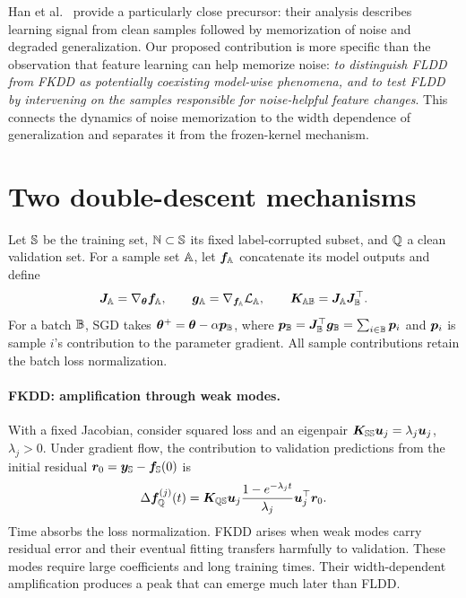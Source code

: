 \documentclass[10pt]{article}
\begin{document}
Han et al.~\cite{pmlr-v267-han25c} provide a particularly close precursor: their analysis describes learning signal from clean samples followed by memorization of noise and degraded generalization. Our proposed contribution is more specific than the observation that feature learning can help memorize noise: \emph{to distinguish FLDD from FKDD as potentially coexisting model-wise phenomena, and to test FLDD by intervening on the samples responsible for noise-helpful feature changes}. This connects the dynamics of noise memorization to the width dependence of generalization and separates it from the frozen-kernel mechanism.

\section{Two double-descent mechanisms}
Let ${\mathbb{S}}$ be the training set, ${\mathbb{N}}\subset{\mathbb{S}}$ its fixed label-corrupted subset, and ${\mathbb{Q}}$ a clean validation set. For a sample set ${\mathbb{A}}$, let ${\bm{f}}_{{\mathbb{A}}}$ concatenate its model outputs and define
\begin{equation}
 {\bm{J}}_{{\mathbb{A}}}=\nabla_{{\bm{\theta}}}{\bm{f}}_{{\mathbb{A}}},\qquad
 {\bm{g}}_{{\mathbb{A}}}=\nabla_{{\bm{f}}_{{\mathbb{A}}}}\mathcal L_{{\mathbb{A}}},\qquad
 {\bm{K}}_{{\mathbb{A}}{\mathbb{B}}}={\bm{J}}_{{\mathbb{A}}}{\bm{J}}_{{\mathbb{B}}}^{\top}.
\end{equation}
For a batch ${\mathbb{B}}$, SGD takes ${\bm{\theta}}^+={\bm{\theta}}-\alpha{\bm{p}}_{{\mathbb{B}}}$, where ${\bm{p}}_{{\mathbb{B}}}={\bm{J}}_{{\mathbb{B}}}^{\top}{\bm{g}}_{{\mathbb{B}}}=\sum_{i\in{\mathbb{B}}}{\bm{p}}_i$ and ${\bm{p}}_i$ is sample $i$'s contribution to the parameter gradient. All sample contributions retain the batch loss normalization.

\paragraph{FKDD: amplification through weak modes.}
With a fixed Jacobian, consider squared loss and an eigenpair ${\bm{K}}_{{\mathbb{S}}{\mathbb{S}}}{\bm{u}}_j=\lambda_j{\bm{u}}_j$, $\lambda_j>0$. Under gradient flow, the contribution to validation predictions from the initial residual ${\bm{r}}_0={\bm{y}}_{{\mathbb{S}}}-{\bm{f}}_{{\mathbb{S}}}(0)$ is
\begin{equation}
 \Delta{\bm{f}}_{{\mathbb{Q}}}^{(j)}(t)
 ={\bm{K}}_{{\mathbb{Q}}{\mathbb{S}}}{\bm{u}}_j
 \frac{1-e^{-\lambda_j t}}{\lambda_j}
 {\bm{u}}_j^\top{\bm{r}}_0.
 \label{eq:fk}
\end{equation}
Time absorbs the loss normalization. FKDD arises when weak modes carry residual error and their eventual fitting transfers harmfully to validation. These modes require large coefficients and long training times. Their width-dependent amplification produces a peak that can emerge much later than FLDD.
\end{document}
